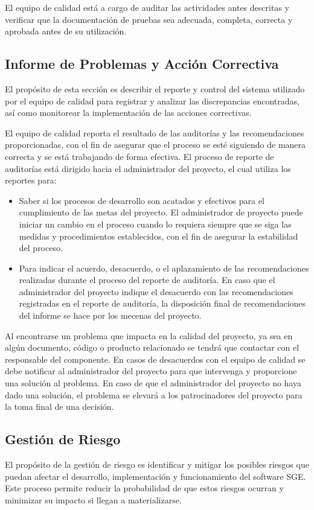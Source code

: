 \documentclass[a4paper,10pt]{article}
\begin{document}
	El equipo de calidad está a cargo de auditar las actividades antes descritas y verificar que la documentación de pruebas sea adecuada, completa, correcta y aprobada antes de su utilización.
	
	\subsection{Informe de Problemas y Acción Correctiva}
	El propósito de esta sección es describir el reporte y control del sistema utilizado por el equipo de calidad para registrar y analizar las discrepancias encontradas, así como monitorear la implementación de las acciones correctivas.
	
	El equipo de calidad reporta el resultado de las auditorías y las recomendaciones proporcionadas, con el fin de asegurar que el proceso se esté siguiendo de manera correcta y se está trabajando de forma efectiva. El proceso de reporte de auditorías está dirigido hacia el administrador del proyecto, el cual utiliza los reportes para:
	\begin{itemize}
		\item Saber si los procesos de desarrollo son acatados y efectivos para el cumplimiento de las metas del proyecto. El administrador de proyecto puede iniciar un cambio en el proceso cuando lo requiera siempre que se siga las medidas y procedimientos establecidos, con el fin de asegurar la estabilidad del proceso.
		\item Para indicar el acuerdo, desacuerdo, o el aplazamiento de las recomendaciones realizadas durante el proceso del reporte de auditoría. En caso que el administrador del proyecto indique el desacuerdo con las recomendaciones registradas en el reporte de auditoría, la disposición final de recomendaciones del informe se hace por los mecenas del proyecto.
	\end{itemize}
	
	Al encontrarse un problema que impacta en la calidad del proyecto, ya sea en algún documento, código o producto relacionado se tendrá que contactar con el responsable del componente. En casos de desacuerdos con el equipo de calidad se debe notificar al administrador del proyecto para que intervenga y proporcione una solución al problema. En caso de que el administrador del proyecto no haya dado una solución, el problema se elevará a los patrocinadores del proyecto para la toma final de una decisión.
	
	\subsection{Gestión de Riesgo}
	El propósito de la gestión de riesgo es identificar y mitigar los posibles riesgos que puedan afectar el desarrollo, implementación y funcionamiento del software SGE. Este proceso permite reducir la probabilidad de que estos riesgos ocurran y minimizar su impacto si llegan a materializarse.
	
\end{document}
